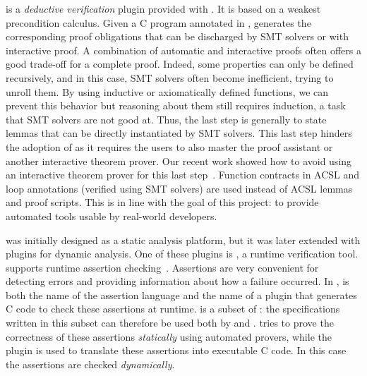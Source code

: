 \Wp is a \emph{deductive verification} plugin provided with \framac.
It is based on a weakest precondition calculus.
Given a C program annotated in \acsl, \Wp generates the corresponding proof obligations that can be discharged by SMT solvers or with interactive proof.
A combination of automatic and interactive proofs often offers a good trade-off for a complete proof.
Indeed, some properties can only be defined recursively, and in this case, SMT solvers often become inefficient, trying to unroll them.
By using inductive or axiomatically defined functions, we can prevent this behavior but reasoning about them still requires induction, a task that SMT solvers are not good at.
Thus, the last step is generally to state lemmas that can be directly instantiated by SMT solvers.
This last step hinders the adoption of \framac as it requires the users to also master the \Coq proof assistant or another interactive theorem prover.
Our recent work showed how to avoid using an interactive theorem prover for this last step~\cite{BLK2019:NFM}.
Function contracts in ACSL and loop annotations (verified using SMT solvers) are used instead of ACSL lemmas and \Coq proof scripts.
This is in line with the goal of this project: to provide automated tools usable by real-world developers.

\framac was initially designed as a static analysis platform, but it was later extended with plugins for dynamic analysis.
One of these plugins is \eacsl, a runtime verification tool.
\eacsl supports runtime assertion checking~\cite{CR2006:SEN}.
Assertions are very convenient for detecting errors and providing information about how a failure occurred.
In \framac, \eacsl is both the name of the assertion language and the name of a plugin that generates C code to check these assertions at runtime.
\eacsl is a subset of \acsl: the specifications written in this subset can therefore be used both by \Wp and \eacsl.
\Wp tries to prove the correctness of these assertions {\em statically} using automated provers, while the plugin \eacsl is used to translate these assertions into executable C code.
In this case the assertions are checked {\em dynamically}.